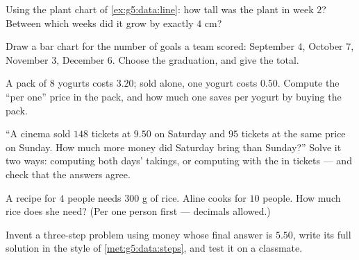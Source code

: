 \begin{exercise}[$\star$]\label{exo:g5:data:6}
Using the plant chart of \cref{ex:g5:data:line}: how tall was the
plant in week $2$? Between which weeks did it grow by exactly
$4$ cm?
\end{exercise}

\begin{exercise}[$\star$]\label{exo:g5:data:7}
Draw a bar chart for the number of goals a team scored:
September $4$, October $7$, November $3$, December $6$. Choose the
graduation, and give the total.
\end{exercise}

\begin{exercise}[$\star$]\label{exo:g5:data:8}
A pack of $8$ yogurts costs $3.20$; sold alone, one yogurt costs
$0.50$. Compute the ``per one'' price in the pack, and how much one
saves per yogurt by buying the pack.
\end{exercise}

\begin{exercise}[$\star\star$]\label{exo:g5:data:9}
``A cinema sold $148$ tickets at $9.50$ on Saturday and $95$ tickets
at the same price on Sunday. How much more money did Saturday bring
than Sunday?'' Solve it two ways: computing both days' takings, or
computing with the \emph{} in tickets --- and check that
the answers agree.
\end{exercise}

\begin{exercise}[$\star\star$]\label{exo:g5:data:10}
A recipe for $4$ people needs $300$ g of rice. Aline cooks for
$10$ people. How much rice does she need? (Per one person first ---
decimals allowed.)
\end{exercise}

\begin{exercise}[$\star\star$]\label{exo:g5:data:11}
Invent a three-step problem using money whose final answer is
$5.50$, write its full solution in the style of
\cref{met:g5:data:steps}, and test it on a classmate.
\end{exercise}
